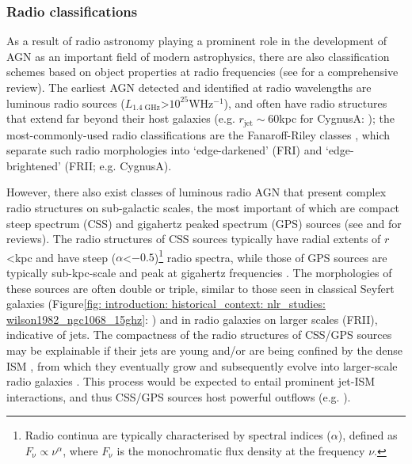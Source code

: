 \subsubsection{Radio classifications}
\label{section: introduction: outflows: taxonomy_of_agn: css_and_gps_sources}

As a result of radio astronomy playing a prominent role in the development of AGN as an important field of modern astrophysics, there are also classification schemes based on object properties at radio frequencies (see \citealt{Tadhunter2016} for a comprehensive review). The earliest AGN detected and identified at radio wavelengths are luminous radio sources ($L_\mathrm{1.4\;GHz}$\;\textgreater\;$10^{25}$\;W\;Hz$^{-1}$), and often have radio structures that extend far beyond their host galaxies (e.g. $r_\mathrm{jet}\sim60$\;kpc for Cygnus\;A: \citealt{Carilli1991}); the most-commonly-used radio classifications are the Fanaroff-Riley classes \citep{Fanaroff1974}, which separate such radio morphologies into `edge-darkened' (FR\;I) and `edge-brightened' (FR\;II; e.g. Cygnus\;A).

However, there also exist classes of luminous radio AGN that present complex radio structures on sub-galactic scales, the most important of which are compact steep spectrum (CSS) and gigahertz peaked spectrum (GPS) sources  (see \citealt{ODea1998} and \citealt{ODea2021} for reviews). The radio structures of CSS sources typically have radial extents of $r$\;\textless{}\;kpc and have steep ($\alpha$\;\textless\;$-0.5$)\footnote{Radio continua are typically characterised by spectral indices ($\alpha$), defined as $F_\mathrm{\nu}\propto\nu^\alpha$, where $F_\mathrm{\nu}$ is the monochromatic flux density at the frequency $\nu$.} radio spectra, while those of GPS sources are typically sub-kpc-scale and peak at gigahertz frequencies \citep{Kellermann1981, ODea1998, Callingham2015}. The morphologies of these sources are often double or triple, similar to those seen in classical Seyfert galaxies (Figure\;\ref{fig: introduction: historical_context: nlr_studies: wilson1982_ngc1068_15ghz}: \citealt{Wilson1982}) and in radio galaxies on larger scales (FRII), indicative of jets. The compactness of the radio structures of CSS/GPS sources may be explainable if their jets are young and/or are being confined by the dense ISM \citep{Bicknell1997, Stanghellini2005, ODea2021}, from which they eventually grow and subsequently evolve into larger-scale radio galaxies \citep{Stanghellini2005, Morganti2007, Kukreti2023}. This process would be expected to entail prominent jet-ISM interactions, and thus CSS/GPS sources host powerful outflows (e.g. \citealt{Holt2008, Holt2011, Santoro2020}).

